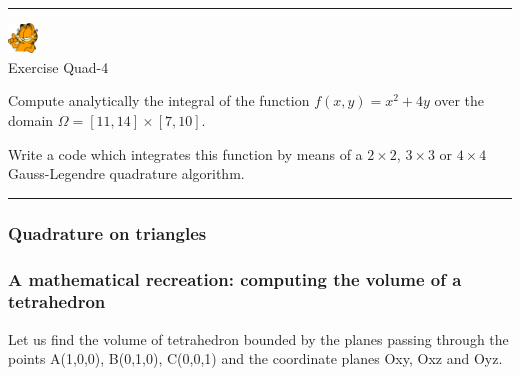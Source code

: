\begin{center}
\begin{minipage}[t]{0.77\textwidth}
\par\noindent\rule{\textwidth}{0.4pt}

\begin{center}
\includegraphics[width=0.8cm]{images/garftr} \\
{\color{orange}Exercise Quad-4}
\end{center}

Compute analytically the integral of the function $f(x,y)=x^2+4y$
over the domain $\Omega = [11,14 ] \times [7,10]$.

Write a code which integrates this function
by means of a $2\times 2$, $3\times 3$ or $4\times 4$ Gauss-Legendre quadrature algorithm.

\par\noindent\rule{\textwidth}{0.4pt}
\end{minipage}
\end{center}








\subsubsection{Quadrature on triangles}




\subsubsection{A mathematical recreation: computing the volume of a tetrahedron}

Let us find the volume of tetrahedron bounded by the planes passing through the points 
A(1,0,0), B(0,1,0), C(0,0,1) and the coordinate planes Oxy, Oxz and Oyz.




